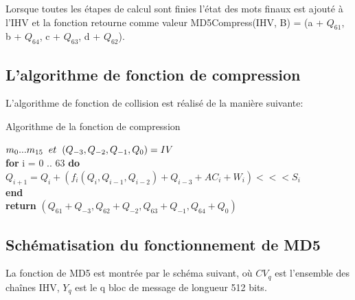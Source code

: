 Lorsque toutes les étapes de calcul sont finies l'état des mots finaux est ajouté à l'IHV et la fonction retourne comme valeur MD5Compress(IHV, B) = (a + $Q_{61}$, b + $Q_{64}$, c + $Q_{63}$, d + $Q_{62}$).

\subsection{L'algorithme de fonction de compression}
L'algorithme de fonction de collision est réalisé de la manière suivante:\\

\begin{algorithm}
\caption{Algorithme de la fonction de compression}
\begin{algorithmic} 
\REQUIRE $m_0 ... m_{15} \hspace{.2cm} et \hspace{.2cm} (Q_{-3}, Q_{-2}, Q_{-1}, Q_0) = IV $\\
{\bf{for}} i = 0 .. 63 {\bf{do}}\\
\hspace{.5cm}$Q_{i+1} = Q_i +  (f_i(Q_i, Q_{i-1}, Q_{i-2}) + Q_{i-3} + AC_i + W_i) <<< S_i$\\
{\bf{end}}\\
{\bf{return}} $(Q_61 + Q_{-3}, Q_62 + Q_{-2}, Q_63 + Q_{-1}, Q_64 + Q_0)$
\end{algorithmic}
\end{algorithm}



\subsection{Schématisation du fonctionnement de MD5}
La fonction de MD5 est montrée par le schéma suivant, où $CV_{q}$ est l'ensemble des chaînes IHV, $Y_{q}$ est le q bloc de message de longueur 512 bits.\\

